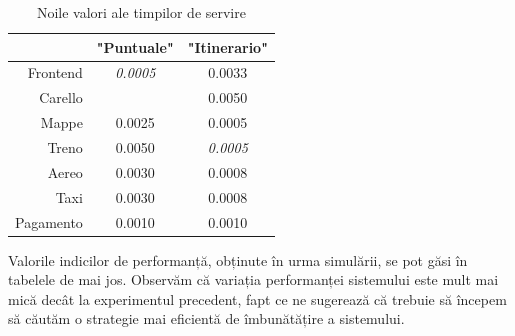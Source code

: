\documentclass[12pt]{article}
\begin{document}
            \begin{table}[!h]
                \centering
                \begin{tabular}{r|cc}
                    \multicolumn{1}{c|}{} & "Puntuale"      & "Itinerario"    \\ \hline
                    Frontend              & \textit{0.0005} & 0.0033 \\
                    Carello               &                 & 0.0050          \\
                    Mappe                 & 0.0025          & 0.0005          \\
                    Treno                 & 0.0050          & \textit{0.0005} \\
                    Aereo                 & 0.0030          & 0.0008          \\
                    Taxi                  & 0.0030          & 0.0008          \\
                    Pagamento             & 0.0010          & 0.0010         
                \end{tabular}
                \caption{Noile valori ale timpilor de servire}
            \end{table}

            Valorile indicilor de performanță, obținute în urma simulării, se pot găsi în tabelele de mai jos. Observăm că variația performanței sistemului este mult mai mică decât la experimentul precedent, fapt ce ne sugerează că trebuie să începem să căutăm o strategie mai eficientă de îmbunătățire a sistemului.
\end{document}
